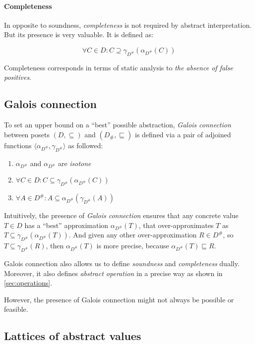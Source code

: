 \documentclass[12pt,oneside]{fithesis2}
\theoremstyle{definition}
\begin{document}
\paragraph{Completeness}
In opposite to soundness, \textit{completeness} is not required by abstract interpretation. But its presence is very valuable. It is defined as: \cite{mine-AIAA10}

\[
  \forall C \in D: C \supseteq \gamma_{D^\#}(\alpha_{D^\#}(C))
\]

Completeness corresponds in terms of static analysis to \textit{the absence of false positives}.

\subsection{Galois connection}

To set an upper bound on a ``best'' possible abstraction\cite{mine-AIAA10}, \textit{Galois connection}  between posets $(D, \subseteq)$ and $(D_\#, \sqsubseteq)$ is defined via a pair of adjoined functions $\langle \alpha_{D^\#}, \gamma_{D^\#} \rangle$ as followed: \cite{CousotCousot79-1}

\begin{enumerate}
  \item $\alpha_{D^\#}$ and $\alpha_{D^\#}$ are \textit{isotone}
  \item $\forall C \in D: C \subseteq \gamma_{D^\#}(\alpha_{D^\#}(C))$
  \item $\forall A \in D^\#: A \subseteq \alpha_{D^\#}(\gamma_{D^\#}(A))$
\end{enumerate}

Intuitively, the presence of \textit{Galois connection} ensures that any concrete value $T \in D$ has a ``best'' approximation $\alpha_{D^\#}(T)$, that over-approximates $T$ as $T \subseteq \gamma_{D^\#}(\alpha_{D^\#}(T))$. And given any other over-approximation $R \in D^\#$, so $T \subseteq \gamma_{D^\#}(R)$, then $\alpha_{D^\#}(T)$ is more precise, because $\alpha_{D^\#}(T) \sqsubseteq R$.

Galois connection also allows us to define \textit{soundness} and \textit{completeness} dually. Moreover, it also defines \textit{abstract operation} in a precise way as shown in \ref{sec:operations}.

However, the presence of Galois connection might not always be possible or feasible.

\subsection{Lattices of abstract values}
\end{document}
